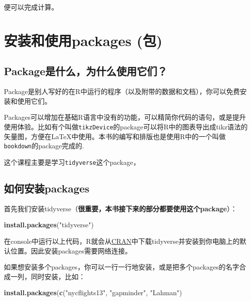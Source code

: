 \documentclass[]{book}
\newenvironment{Shaded}{\begin{snugshade}}{\end{snugshade}}
\newcommand{\KeywordTok}[1]{\textcolor[rgb]{0.13,0.29,0.53}{\textbf{#1}}}
\newcommand{\NormalTok}[1]{#1}
\newcommand{\StringTok}[1]{\textcolor[rgb]{0.31,0.60,0.02}{#1}}
\begin{document}
便可以完成计算。

\hypertarget{packages}{%
\section{安装和使用packages (包)}\label{packages}}

\hypertarget{packages-what}{%
\subsection{Package是什么，为什么使用它们？}\label{packages-what}}

Package是别人写好的在R中运行的程序（以及附带的数据和文档），你可以免费安装和使用它们。

Packages可以增加在基础R语言中没有的功能，可以精简你代码的语句，或是提升使用体验。比如有个叫做\texttt{tikzDevice}的package可以将R中的图表导出成tikz语法的矢量图，方便在LaTeX中使用。本书的编写和排版也是使用R中的一个叫做\texttt{bookdown}的package完成的.

这个课程主要是学习\texttt{tidyverse}这个package，

\hypertarget{package-install}{%
\subsection{如何安装packages}\label{package-install}}

首先我们安装tidyverse（\textbf{很重要，本书接下来的部分都要使用这个package}）：

\begin{Shaded}
\begin{Highlighting}[]
\KeywordTok{install.packages}\NormalTok{(}\StringTok{"tidyverse"}\NormalTok{)}
\end{Highlighting}
\end{Shaded}

在console中运行以上代码，R就会从\href{https://cran.r-project.org}{CRAN}中下载tidyverse并安装到你电脑上的默认位置。因此安装packages需要网络连接。

如果想安装多个packages，你可以一行一行地安装，或是把多个packages的名字合成一列，同时安装，比如：

\begin{Shaded}
\begin{Highlighting}[]
\KeywordTok{install.packages}\NormalTok{(}\KeywordTok{c}\NormalTok{(}\StringTok{"nycflights13"}\NormalTok{, }\StringTok{"gapminder"}\NormalTok{, }\StringTok{"Lahman"}\NormalTok{)}
\end{Highlighting}
\end{Shaded}
\end{document}
